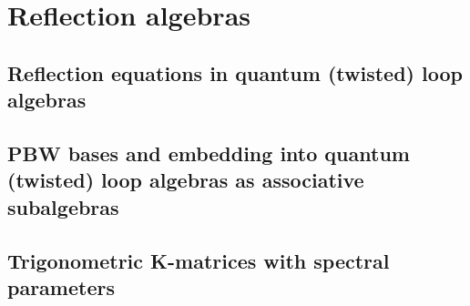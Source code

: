 \section{Reflection algebras}
    \subsection{Reflection equations in quantum (twisted) loop algebras}

    \subsection{PBW bases and embedding into quantum (twisted) loop algebras as associative subalgebras}

    \subsection{Trigonometric K-matrices with spectral parameters}